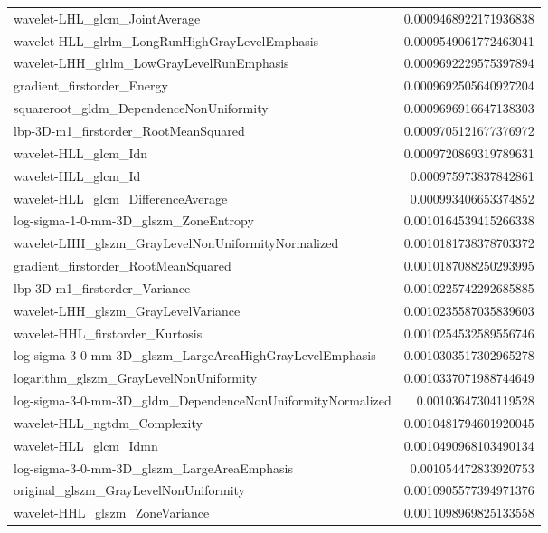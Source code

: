 {\begin{xltabular}[H]{\textwidth}{X r}
        wavelet-LHL\_glcm\_JointAverage & 0.0009468922171936838 \\
        wavelet-HLL\_glrlm\_LongRunHighGrayLevelEmphasis & 0.0009549061772463041 \\
        wavelet-LHH\_glrlm\_LowGrayLevelRunEmphasis & 0.0009692229575397894 \\
        gradient\_firstorder\_Energy & 0.0009692505640927204 \\
        squareroot\_gldm\_DependenceNonUniformity & 0.0009696916647138303 \\
        lbp-3D-m1\_firstorder\_RootMeanSquared & 0.0009705121677376972 \\
        wavelet-HLL\_glcm\_Idn & 0.0009720869319789631 \\
        wavelet-HLL\_glcm\_Id & 0.000975973837842861 \\
        wavelet-HLL\_glcm\_DifferenceAverage & 0.000993406653374852 \\
        log-sigma-1-0-mm-3D\_glszm\_ZoneEntropy & 0.0010164539415266338 \\
        wavelet-LHH\_glszm\_GrayLevelNonUniformityNormalized & 0.0010181738378703372 \\
        gradient\_firstorder\_RootMeanSquared & 0.0010187088250293995 \\
        lbp-3D-m1\_firstorder\_Variance & 0.0010225742292685885 \\
        wavelet-LHH\_glszm\_GrayLevelVariance & 0.0010235587035839603 \\
        wavelet-HHL\_firstorder\_Kurtosis & 0.0010254532589556746 \\
        log-sigma-3-0-mm-3D\_glszm\_LargeAreaHighGrayLevelEmphasis & 0.0010303517302965278 \\
        logarithm\_glszm\_GrayLevelNonUniformity & 0.0010337071988744649 \\
        log-sigma-3-0-mm-3D\_gldm\_DependenceNonUniformityNormalized & 0.00103647304119528 \\
        wavelet-HLL\_ngtdm\_Complexity & 0.0010481794601920045 \\
        wavelet-HLL\_glcm\_Idmn & 0.0010490968103490134 \\
        log-sigma-3-0-mm-3D\_glszm\_LargeAreaEmphasis & 0.001054472833920753 \\
        original\_glszm\_GrayLevelNonUniformity & 0.0010905577394971376 \\
        wavelet-HHL\_glszm\_ZoneVariance & 0.0011098969825133558 \\

\end{xltabular}}
